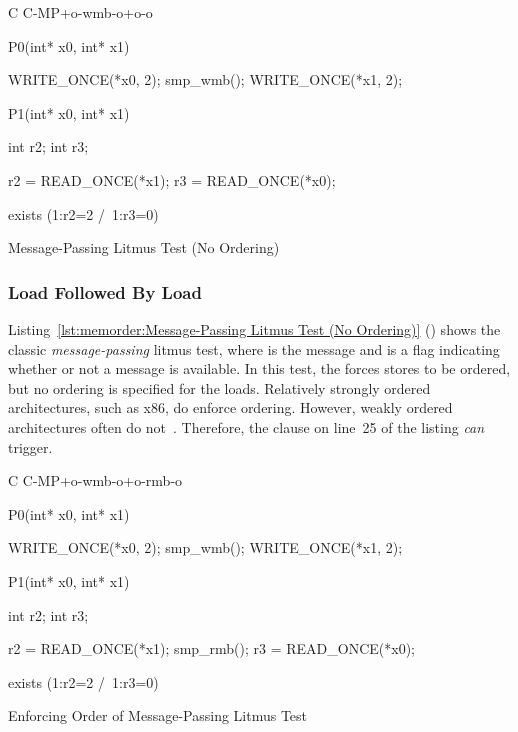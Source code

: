 
\begin{listing}[tbp]
{ \scriptsize
\begin{verbbox}[\LstLineNo]
C C-MP+o-wmb-o+o-o

{
}


P0(int* x0, int* x1) {

  WRITE_ONCE(*x0, 2);
  smp_wmb();
  WRITE_ONCE(*x1, 2);

}

P1(int* x0, int* x1) {

  int r2;
  int r3;

  r2 = READ_ONCE(*x1);
  r3 = READ_ONCE(*x0);

}

exists (1:r2=2 /\ 1:r3=0)
\end{verbbox}
}
\centering
\theverbbox
\caption{Message-Passing Litmus Test (No Ordering)}
\label{lst:memorder:Message-Passing Litmus Test (No Ordering)}
\end{listing}

\subsubsection{Load Followed By Load}
Listing~\ref{lst:memorder:Message-Passing Litmus Test (No Ordering)}
()
shows the classic \emph{message-passing} litmus test, where  is
the message and  is a flag indicating whether or not a message
is available.
In this test, the  forces  stores to be ordered,
but no ordering is specified for the loads.
Relatively strongly ordered architectures, such as x86, do enforce ordering.
However, weakly ordered architectures often do
not~\cite{JadeAlglave2011ppcmem}.
Therefore, the  clause on line~25 of the listing \emph{can}
trigger.

\begin{listing}[tbp]
{ \scriptsize
\begin{verbbox}[\LstLineNo]
C C-MP+o-wmb-o+o-rmb-o

{
}

P0(int* x0, int* x1) {

  WRITE_ONCE(*x0, 2);
  smp_wmb();
  WRITE_ONCE(*x1, 2);

}

P1(int* x0, int* x1) {

  int r2;
  int r3;

  r2 = READ_ONCE(*x1);
  smp_rmb();
  r3 = READ_ONCE(*x0);

}

exists (1:r2=2 /\ 1:r3=0)
\end{verbbox}
}
\centering
\theverbbox
\caption{Enforcing Order of Message-Passing Litmus Test}
\label{lst:memorder:Enforcing Order of Message-Passing Litmus Test}
\end{listing}

